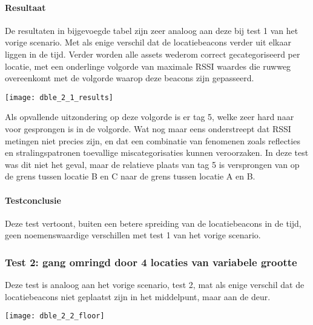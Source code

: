 \paragraph{Resultaat}
\begin{minipage}{0.42\textwidth}
De resultaten in bijgevoegde tabel zijn zeer analoog aan deze bij test 1 van het vorige scenario. Met als enige verschil dat de locatiebeacons verder uit elkaar liggen in de tijd. Verder worden alle assets wederom correct gecategoriseerd per locatie, met een onderlinge volgorde van maximale RSSI waardes die ruwweg overeenkomt met de volgorde waarop deze beacons zijn gepasseerd. 
\end{minipage}
\hfill
\begin{minipage}{0.55\textwidth}
	\texttt{[image: dble\_2\_1\_results]}
\end{minipage}

Als opvallende uitzondering op deze volgorde is er tag 5, welke zeer hard naar voor gesprongen is in de volgorde. Wat nog maar eens onderstreept dat RSSI metingen niet precies zijn, en dat een combinatie van fenomenen zoals reflecties en stralingspatronen toevallige miscategorisaties kunnen veroorzaken. In deze test was dit niet het geval, maar de relatieve plaats van tag 5 is versprongen van op de grens tussen locatie B en C naar de grens tussen locatie A en B.

\paragraph{Testconclusie}
Deze test vertoont, buiten een betere spreiding van de locatiebeacons in de tijd, geen noemenswaardige verschillen met test 1 van het vorige scenario.

\subsubsection{Test 2: gang omringd door 4 locaties van variabele grootte}
\begin{minipage}{0.55\textwidth}
Deze test is analoog aan het vorige scenario, test 2, mat als enige verschil dat de locatiebeacons niet geplaatst zijn in het middelpunt, maar aan de deur.
\end{minipage}
\hfill
\begin{minipage}{0.42\textwidth}
	\texttt{[image: dble\_2\_2\_floor]}
\end{minipage}

